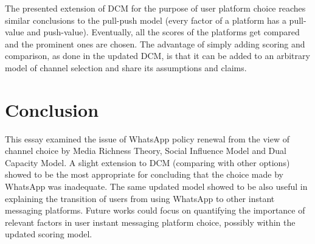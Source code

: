 The presented extension of DCM for the purpose of user platform choice reaches similar conclusions to the pull-push model \citet{schreiner2015examining} (every factor of a platform has a pull-value and push-value).
Eventually, all the scores of the platforms get compared and the prominent ones are chosen.
The advantage of simply adding scoring and comparison, as done in the updated DCM, is that it can be added to an arbitrary model of channel selection and share its assumptions and claims.

\section{Conclusion} \label{sec:conclusion}

This essay examined the issue of WhatsApp policy renewal from the view of channel choice by Media Richness Theory, Social Influence Model and Dual Capacity Model.
A slight extension to DCM (comparing with other options) showed to be the most appropriate for concluding that the choice made by WhatsApp was inadequate.
The same updated model showed to be also useful in explaining the transition of users from using WhatsApp to other instant messaging platforms.
Future works could focus on quantifying the importance of relevant factors in user instant messaging platform choice, possibly within the updated scoring model.